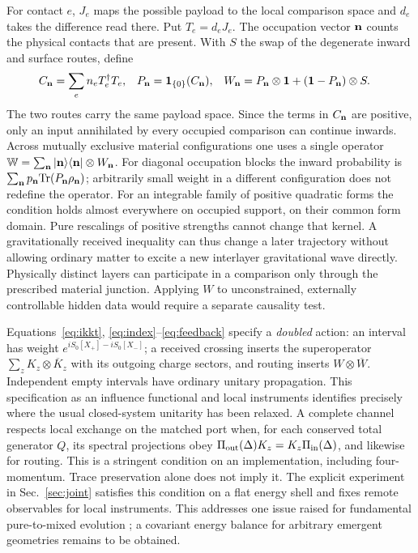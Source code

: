 \documentclass[11pt,a4paper]{article}
\newcommand{\id}{\mathbf 1}
\begin{document}
For contact \(e\), \(J_e\) maps the possible payload to the local comparison space and \(d_e\) takes the difference read there. Put \(T_e=d_eJ_e\). The occupation vector \({\bf n}\) counts the physical contacts that are present. With \(S\) the swap of the degenerate inward and surface routes, define
\begin{align}
 C_{\bf n}&=\sum_e n_e T_e^\dagger T_e,&
 P_{\bf n}&=\mathbf 1_{\{0\}}(C_{\bf n}),&
 W_{\bf n}&=P_{\bf n}\otimes\id+(\id-P_{\bf n})\otimes S .
 \label{eq:feedback}
\end{align}
The two routes carry the same payload space. Since the terms in \(C_{\bf n}\) are positive, only an input annihilated by every occupied comparison can continue inwards. Across mutually exclusive material configurations one uses a single operator \(\mathbb W=\sum_{\bf n}|{\bf n}\rangle\langle{\bf n}|\otimes W_{\bf n}\). For diagonal occupation blocks the inward probability is \(\sum_{\bf n}p_{\bf n}{\rm Tr}(P_{\bf n}\rho_{\bf n})\); arbitrarily small weight in a different configuration does not redefine the operator. For an integrable family of positive quadratic forms the condition holds almost everywhere on occupied support, on their common form domain. Pure rescalings of positive strengths cannot change that kernel. A gravitationally received inequality can thus change a later trajectory without allowing ordinary matter to excite a new interlayer gravitational wave directly. Physically distinct layers can participate in a comparison only through the prescribed material junction. Applying \(W\) to unconstrained, externally controllable hidden data would require a separate causality test.

Equations~\eqref{eq:ikkt}, \eqref{eq:index}--\eqref{eq:feedback} specify a \emph{doubled} action: an interval has weight \(e^{iS_0[X_+]-iS_0[X_-]}\); a received crossing inserts the superoperator \(\sum_z K_z\otimes\overline K_z\) with its outgoing charge sectors, and routing inserts \(W\otimes\overline W\). Independent empty intervals have ordinary unitary propagation. This specification as an influence functional and local instruments identifies precisely where the usual closed-system unitarity has been relaxed. A complete channel respects local exchange on the matched port when, for each conserved total generator \(Q\), its spectral projections obey \(\Pi_{\rm out}(\Delta)K_z=K_z\Pi_{\rm in}(\Delta)\), and likewise for routing. This is a stringent condition on an implementation, including four-momentum. Trace preservation alone does not imply it. The explicit experiment in Sec.~\ref{sec:joint} satisfies this condition on a flat energy shell and fixes remote observables for local instruments. This addresses one issue raised for fundamental pure-to-mixed evolution \cite{bps}; a covariant energy balance for arbitrary emergent geometries remains to be obtained.
\end{document}
